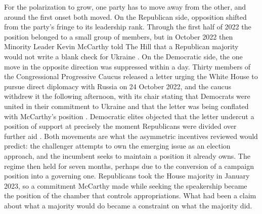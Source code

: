 For the polarization to grow, one party has to move away from the other, and around the first onset both moved. On the Republican side, opposition shifted from the party's fringe to its leadership rank. Through the first half of 2022 the position belonged to a small group of members, but in October 2022 then Minority Leader Kevin McCarthy told The Hill that a Republican majority would not write a blank check for Ukraine \citep{brooksMcCarthyWarnsNo2022}. On the Democratic side, the one move in the opposite direction was suppressed within a day. Thirty members of the Congressional Progressive Caucus released a letter urging the White House to pursue direct diplomacy with Russia on 24 October 2022, and the caucus withdrew it the following afternoon, with its chair stating that Democrats were united in their commitment to Ukraine and that the letter was being conflated with McCarthy's position \citep{pilkingtonProgressiveDemocratsRetract2022}. Democratic elites objected that the letter undercut a position of support at precisely the moment Republicans were divided over further aid \citep{rajuJayapalWithdrawsLetter2022}. Both movements are what the asymmetric incentives reviewed would predict: the challenger attempts to own the emerging issue as an election approach, and the incumbent seeks to maintain a position it already owns. The regime then held for seven months, perhaps due to the conversion of a campaign position into a governing one. Republicans took the House majority in January 2023, so a commitment McCarthy made while seeking the speakership became the position of the chamber that controls appropriations. What had been a claim about what a majority would do became a constraint on what the majority did.

